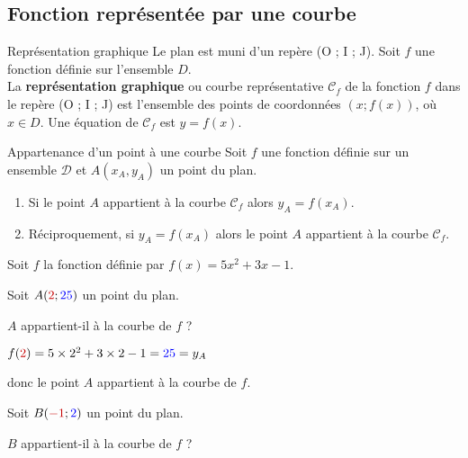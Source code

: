 \begin{pageCours} %


\subsection{Fonction représentée par une courbe}


\begin{DefT}{Représentation graphique}
Le plan est muni d'un repère (O ; I ; J). Soit $f$ une fonction définie sur l'ensemble $D$.\\
La \textbf{représentation graphique} ou courbe représentative $\mathscr{C}_f$ de la fonction $f$ dans le repère (O ; I ; J) est l'ensemble des points de coordonnées $(x ; f (x))$, où $x \in D$. Une équation de $\mathscr{C}_f$ est $y=f(x)$.
\end{DefT}

\begin{PpT}{Appartenance d'un point à une courbe}
Soit $f$ une fonction définie sur un ensemble $\mathcal{D}$ et $A(x_A,y_A)$ un point du plan.
\begin{enumerate}
\item Si le point $A$ appartient à la courbe $\mathscr{C}_f$ alors $y_A=f(x_A)$.
\item Réciproquement, si $y_A=f(x_A)$ alors le point $A$ appartient à la courbe $\mathscr{C}_f$. 
\end{enumerate}
\end{PpT}

\begin{Ex} 

Soit $f$ la fonction définie par $f(x)=5x^2+3x-1$.

\begin{minipage}{0.5\linewidth} 
Soit $A({\color{red}2};{\color{blue}25})$ un point du plan. 

$A$ appartient-il à la courbe de $f$ ?

$f({\color{red}2})=5\times 2^2+3\times 2-1={\color{blue}25}=y_A$ 

donc le point $A$ appartient à la courbe de $f$.  
\end{minipage}
\begin{minipage}{0.5\linewidth} 
Soit $B({\color{red}-1};{\color{blue}2})$ un point du plan.  

$B$ appartient-il à la courbe de $f$ ?


\end{minipage}
\end{Ex}
\end{pageCours}
